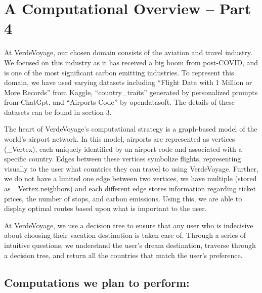 \documentclass[11pt]{article}
\begin{document}
\section*{A Computational Overview -- Part 4}

\noindent At VerdeVoyage, our chosen domain consists of the aviation and travel industry. We focused on this industry as it has received a big boom from post-COVID, and is one of the most significant carbon emitting industries. To represent this domain, we have used varying datasets including “Flight Data with 1 Million or More Records” from Kaggle, “country\_traits” generated by personalized prompts from ChatGpt, and “Airports Code” by opendatasoft. The details of these datasets can be found in section 3. 

\medskip

\noindent The heart of VerdeVoyage’s computational strategy is a graph-based model of the world’s airport network. In this model, airports are represented as vertices (\_Vertex), each uniquely identified by an airport code and associated with a specific country. Edges between these vertices symbolize flights, representing visually to the user what countries they can travel to using VerdeVoyage. Further, we do not have a limited one edge between two vertices, we have multiple (stored as \_Vertex.neighbors) and each different edge stores information regarding ticket prices, the number of stops, and carbon emissions. Using this, we are able to display optimal routes based upon what is important to the user.

\medskip

\noindent At VerdeVoyage, we use a decision tree to ensure that any user who is indecisive about choosing their vacation destination is taken care of. Through a series of intuitive questions, we understand the user's dream destination, traverse through a decision tree, and return all the countries that match the user's preference.

\medskip

\subsection*{Computations we plan to perform:}
\end{document}

